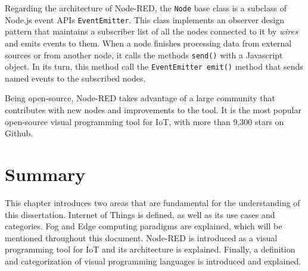 \par Regarding the architecture of Node-RED, the \texttt{Node} base class is a subclass of Node.js event APIs \texttt{EventEmitter}. This class implements an observer design pattern that maintains a subscriber list of all the nodes connected to it by \emph{wires} and emits events to them. When a node finishes processing data from external sources or from another node, it calls the methods \texttt{send()} with a Javascript object. In its turn, this method call the \texttt{EventEmitter emit()} method that sends named events to the subscribed nodes. 
\par Being open-source, Node-RED takes advantage of a large community that contributes with new nodes and improvements to the tool. It is the most popular open-source visual programming tool for IoT, with more than 9,300 stars on Github.

\section{Summary}

This chapter introduces two areas that are fundamental for the understanding of this dissertation. Internet of Things is defined, as well as its use cases and categories. Fog and Edge computing paradigms are explained, which will be mentioned throughout this document. Node-RED is introduced as a visual programming tool for IoT and its architecture is explained. Finally, a definition and categorization of visual programming languages is introduced and explained.
